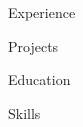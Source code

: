 \documentclass[8pt, letterpaper]{article}
\author{Ben Chislett}
\begin{document}
\begin{section}{Experience}
\blindtext
\end{section}

\begin{section}{Projects}
\blindtext
\end{section}

\begin{section}{Education}
\blindtext
\end{section}

\begin{section}{Skills}
\blindtext
\end{section}
\end{document}
